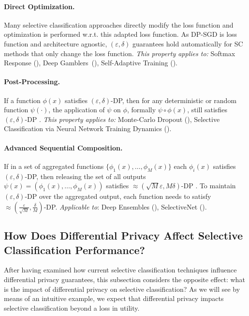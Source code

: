 \paragraph{Direct Optimization.} Many selective classification approaches directly modify the loss function and optimization is performed w.r.t. this adapted loss function. As DP-SGD is loss function and architecture agnostic, $(\varepsilon, \delta)$ guarantees hold automatically for SC methods that only change the loss function. \emph{This property applies to:} Softmax Response (\sr), Deep Gamblers~(\dg), Self-Adaptive Training (\sat).

\paragraph{Post-Processing.} If a function $\phi(x)$ satisfies $(\varepsilon,\delta)$-DP, then for any deterministic or random function $\psi(\cdot)$, the application of $\psi$ on $\phi$, formally $\psi \circ \phi (x)$, still satisfies $(\varepsilon,\delta)$-DP \citep{dwork2006calibrating}. \emph{This property applies to:} Monte-Carlo Dropout (\mcdo), Selective Classification via Neural Network Training Dynamics (\sctd).

\paragraph{Advanced Sequential Composition.} If in a set of aggregated functions $\{\phi_1(x), \ldots, \phi_M(x)\}$ each $\phi_i(x)$ satisfies $(\varepsilon,\delta)$-DP, then releasing the set of all outputs $\psi(x) = (\phi_1(x), \ldots, \phi_M(x))$ satisfies $\approx (\sqrt{M}\varepsilon,M\delta)$-DP \citep{dwork2006calibrating}. To maintain $(\varepsilon, \delta)$-DP over the aggregated output, each function needs to satisfy $\approx(\frac{\varepsilon}{\sqrt M}, \frac{\delta}{M})$-DP. \emph{Applicable to}: Deep Ensembles (\de), SelectiveNet (\sn).

\subsection{How Does Differential Privacy Affect Selective Classification Performance?} 
\label{sec:dp_affects_sc}

After having examined how current selective classification techniques influence differential privacy guarantees, this subsection considers the opposite effect: what is the impact of differential privacy on selective classification? As we will see by means of an intuitive example, we expect that differential privacy impacts selective classification beyond a loss in utility.

